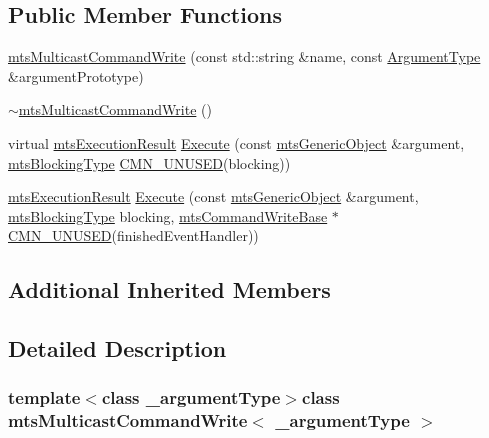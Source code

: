 \subsection*{Public Member Functions}
\begin{DoxyCompactItemize}
\item 
\hyperlink{classmts_multicast_command_write_af6df9513f0bbc9dccd2775429db99bb9}{mts\+Multicast\+Command\+Write} (const std\+::string \&name, const \hyperlink{classmts_multicast_command_write_a064ab3c37be15f5f41dc6fd39595f207}{Argument\+Type} \&argument\+Prototype)
\item 
\hyperlink{classmts_multicast_command_write_ae364a240cfc90e4c0cfa2316fc8471f8}{$\sim$mts\+Multicast\+Command\+Write} ()
\item 
virtual \hyperlink{classmts_execution_result}{mts\+Execution\+Result} \hyperlink{classmts_multicast_command_write_a791d2a0dd7453735f3c5859107f855fb}{Execute} (const \hyperlink{classmts_generic_object}{mts\+Generic\+Object} \&argument, \hyperlink{mts_forward_declarations_8h_ad7426ccb6c883bc780d0ee197dddcbe7}{mts\+Blocking\+Type} \hyperlink{cmn_portability_8h_a021894e2626935fa2305434b1e893ff6}{C\+M\+N\+\_\+\+U\+N\+U\+S\+E\+D}(blocking))
\item 
\hyperlink{classmts_execution_result}{mts\+Execution\+Result} \hyperlink{classmts_multicast_command_write_abdd5968cb00cca869eb59be2ff83cc1c}{Execute} (const \hyperlink{classmts_generic_object}{mts\+Generic\+Object} \&argument, \hyperlink{mts_forward_declarations_8h_ad7426ccb6c883bc780d0ee197dddcbe7}{mts\+Blocking\+Type} blocking, \hyperlink{classmts_command_write_base}{mts\+Command\+Write\+Base} $\ast$\hyperlink{cmn_portability_8h_a021894e2626935fa2305434b1e893ff6}{C\+M\+N\+\_\+\+U\+N\+U\+S\+E\+D}(finished\+Event\+Handler))
\end{DoxyCompactItemize}
\subsection*{Additional Inherited Members}


\subsection{Detailed Description}
\subsubsection*{template$<$class \+\_\+argument\+Type$>$class mts\+Multicast\+Command\+Write$<$ \+\_\+argument\+Type $>$}

